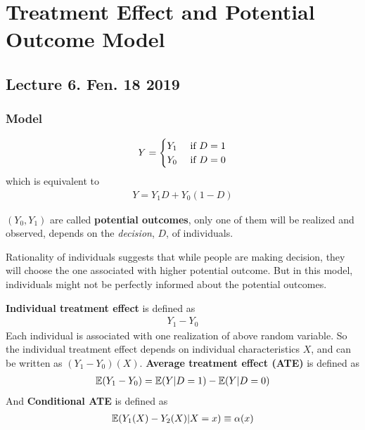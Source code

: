 \documentclass[11pt]{article}
\begin{document}
	\section{Treatment Effect and Potential Outcome Model}
		\subsection{Lecture 6. Fen. 18 2019}
			\subsubsection{Model}
				\begin{gather}
					Y = \begin{cases}
						Y_1 &\text{{ if }} D = 1 \\
						Y_0 &\text{{ if }} D = 0
					\end{cases}
				\end{gather}
				which is equivalent to
				\begin{gather}
					Y = Y_1 D + Y_0 (1 - D)
				\end{gather}
				
				\begin{definition}
					$(Y_0, Y_1)$ are called \textbf{potential outcomes}, only one of them will be realized and observed, depends on the \emph{decision}, $D$, of individuals.
				\end{definition}
				
				\begin{remark}
					Rationality of individuals suggests that while people are making decision, they will choose the one associated with higher potential outcome. But in this model, individuals might not be perfectly informed about the potential outcomes.
				\end{remark}
				
				\begin{definition}
					\textbf{Individual treatment effect} is defined as
					\begin{gather}
						Y_1 - Y_0
					\end{gather} Each individual is associated with one realization of above random variable. So the individual treatment effect depends on individual characteristics $X$, and can be written as $(Y_1 - Y_0)(X)$.
					\textbf{Average treatment effect (ATE)} is defined as
					\begin{gather}
						\mathbb{E}({Y_1 - Y_0}) = \mathbb{E}({Y|D=1}) - \mathbb{E}({Y|D=0})
					\end{gather}
					And \textbf{Conditional ATE} is defined as 
					\begin{gather}
						\mathbb{E}({Y_1(X) - Y_2(X) | X = x}) \equiv \alpha(x)
					\end{gather}
				\end{definition}
				
\end{document}
